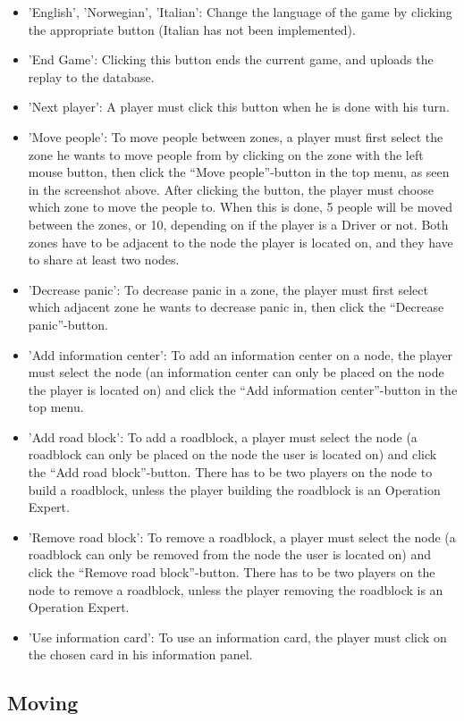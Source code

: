 \begin{itemize}
\item 'English', 'Norwegian', 'Italian': Change the language of the game by clicking the appropriate button (Italian has not been implemented).
\item 'End Game': Clicking this button ends the current game, and uploads the replay to the database.
\item 'Next player': A player must click this button when he is done with his turn.
\item 'Move people': To move people between zones, a player must first select the zone he wants to move people from by clicking on the zone with the left mouse button, then click the “Move people”-button in the top menu, as seen in the screenshot above. After clicking the button, the player must choose which zone to move the people to. When this is done, 5 people will be moved between the zones, or 10, depending on if the player is a Driver or not. Both zones have to be adjacent to the node the player is located on, and they have to share at least two nodes.
\item 'Decrease panic': To decrease panic in a zone, the player must first select which adjacent zone he wants to decrease panic in, then click the “Decrease panic”-button.
\item 'Add information center': To add an information center on a node, the player must select the node (an information center can only be placed on the node the player is located on) and click the “Add information center”-button in the top menu.
\item 'Add road block': To add a roadblock, a player must select the node (a roadblock can only be placed on the node the user is located on) and click the “Add road block”-button. There has to be two players on the node to build a roadblock, unless the player building the roadblock is an Operation Expert.
\item 'Remove road block': To remove a roadblock, a player must select the node (a roadblock can only be removed from the node the user is located on) and click the “Remove road block”-button. There has to be two players on the node to remove a roadblock, unless the player removing the roadblock is an Operation Expert.
\item 'Use information card': To use an information card, the player must click on the chosen card in his information panel.
\end{itemize}

\subsection*{Moving}

